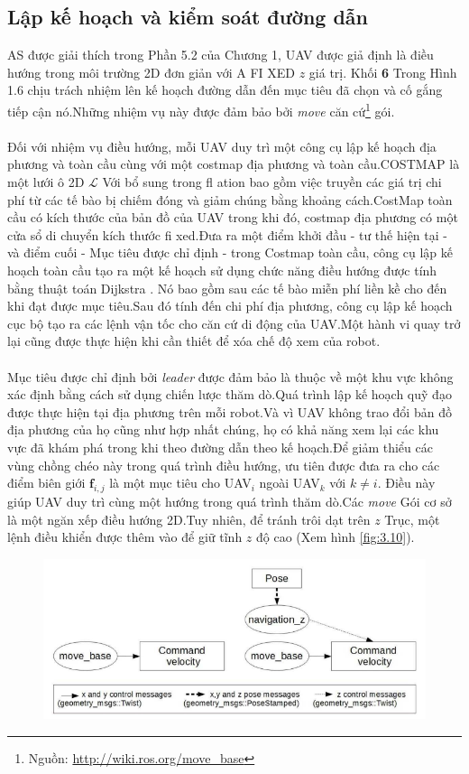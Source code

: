 \documentclass[11pt,openany]{book}
\begin{document}
\begin{algorimth}[H]
\subsection{Lập kế hoạch và kiểm soát đường dẫn}
AS được giải thích trong Phần 5.2 của Chương 1, UAV được giả định là điều hướng trong môi trường 2D đơn giản với A FI XED $z$ giá trị. Khối \textbf{6} Trong Hình 1.6 chịu trách nhiệm lên kế hoạch đường dẫn đến mục tiêu đã chọn và cố gắng tiếp cận nó.Những nhiệm vụ này được đảm bảo bởi \textit{move} căn cứ\footnote{Nguồn: \url{http://wiki.ros.org/move_base}} gói.\\\\
Đối với nhiệm vụ điều hướng, mỗi UAV duy trì một công cụ lập kế hoạch địa phương và toàn cầu cùng với một costmap địa phương và toàn cầu.COSTMAP là một lưới ô 2D $\mathcal{L}$ Với bổ sung trong fl ation bao gồm việc truyền các giá trị chi phí từ các tế bào bị chiếm đóng và giảm chúng bằng khoảng cách.CostMap toàn cầu có kích thước của bản đồ của UAV trong khi đó, costmap địa phương có một cửa sổ di chuyển kích thước fi xed.Đưa ra một điểm khởi đầu - tư thế hiện tại - và điểm cuối - Mục tiêu được chỉ định - trong Costmap toàn cầu, công cụ lập kế hoạch toàn cầu tạo ra một kế hoạch sử dụng chức năng điều hướng được tính bằng thuật toán Dijkstra \cite{dijkstra1959note}. Nó bao gồm sau các tế bào miễn phí liền kề cho đến khi đạt được mục tiêu.Sau đó tính đến chi phí địa phương, công cụ lập kế hoạch cục bộ tạo ra các lệnh vận tốc cho căn cứ di động của UAV.Một hành vi quay trở lại cũng được thực hiện khi cần thiết để xóa chế độ xem của robot.\\\\
Mục tiêu được chỉ định bởi \textit{leader} được đảm bảo là thuộc về một khu vực không xác định bằng cách sử dụng chiến lược thăm dò.Quá trình lập kế hoạch quỹ đạo được thực hiện tại địa phương trên mỗi robot.Và vì UAV không trao đổi bản đồ địa phương của họ cũng như hợp nhất chúng, họ có khả năng xem lại các khu vực đã khám phá trong khi theo đường dẫn theo kế hoạch.Để giảm thiểu các vùng chồng chéo này trong quá trình điều hướng, ưu tiên được đưa ra cho các điểm biên giới $\mathbf{f}_{i,j}$ là một mục tiêu cho UAV$_i$ ngoài UAV$_k$ với $k \neq i$. Điều này giúp UAV duy trì cùng một hướng trong quá trình thăm dò.Các \textit{move} Gói cơ sở là một ngăn xếp điều hướng 2D.Tuy nhiên, để tránh trôi dạt trên $z$ Trục, một lệnh điều khiển được thêm vào để giữ tĩnh $z$ độ cao (Xem hình \ref{fig:3.10}).
\begin{figure}[H]
    \centering
    \includegraphics[scale=0.4]{assets/3_10.png}

\end{figure}
\end{algorimth}
\end{document}
